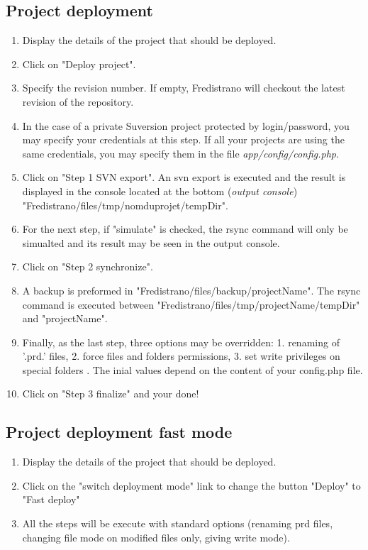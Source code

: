 \documentclass[12pt,a4paper]{report}
\begin{document}
\subsection{Project deployment}
\begin{enumerate}
\item Display the details of the project that should be deployed.
\item Click on "Deploy project".
\item Specify the revision number. If empty, Fredistrano will checkout the latest revision of the repository.
\item In the case of a private Suversion project protected by login/password, you may specify your credentials at this step. If all your projects are using the same credentials, you may specify them in the file \textit{app/config/config.php}.
\item Click on "Step 1 SVN export". An svn export is executed and the result is displayed in the console located at the bottom (\textit{output console}) "Fredistrano/files/tmp/nomduprojet/tempDir".
\item For the next step, if "simulate" is checked, the rsync command will only be simualted and its  result may be seen in the output console.
\item Click on "Step 2 synchronize".
\item A backup is preformed in "Fredistrano/files/backup/projectName". The rsync command is executed between "Fredistrano/files/tmp/projectName/tempDir" and "projectName".
\item Finally, as the last step, three options may be overridden: 1. renaming of '.prd.' files, 2. force files and folders permissions, 3. set write privileges on special folders . The inial values depend on the content of your config.php file.
\item Click on "Step 3 finalize" and your done!
\end{enumerate}

\subsection{Project deployment fast mode}
\begin{enumerate}
\item Display the details of the project that should be deployed.
\item Click on the "switch deployment mode" link to change the button "Deploy" to "Fast deploy"
\item All the steps will be execute with standard options (renaming prd files, changing file mode on modified files only, giving write mode). 
\end{enumerate}
\end{document}
